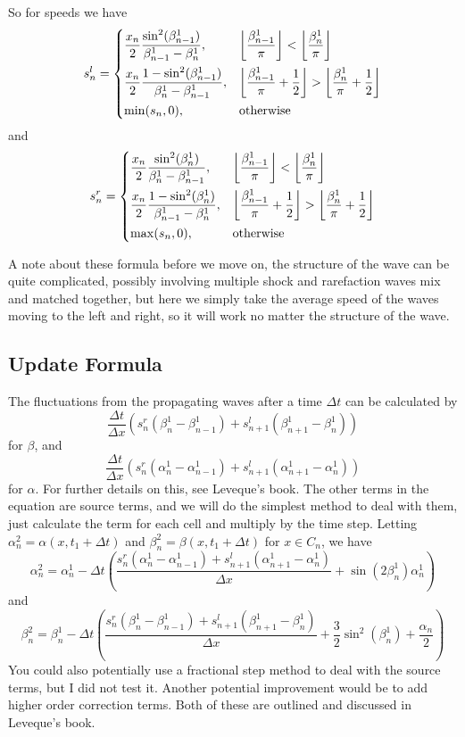 \documentclass[12pt]{article}
\begin{document}
So for speeds we have
\[ s^l_n = \begin{dcases}
    \frac{x_n}{2} \frac{\sin^2(\beta_{n-1}^1)}{\beta_{n-1}^1 - \beta_n^1}, & \left\lfloor
    \frac{\beta_{n-1}^1}{\pi} \right\rfloor < \left\lfloor \frac{\beta_n^1}{\pi} \right\rfloor \\
    \frac{x_n}{2} \frac{1 - \sin^2(\beta_{n-1}^1)}{\beta_n^1 - \beta_{n-1}^1}, & \left\lfloor
    \frac{\beta_{n-1}^1}{\pi} + \frac{1}{2} \right\rfloor > \left\lfloor \frac{\beta_n^1}{\pi} +
    \frac{1}{2} \right\rfloor \\
    \min(s_n, 0), & \text{otherwise}
\end{dcases} \]
and
\[ s^r_n = \begin{dcases}
    \frac{x_n}{2} \frac{\sin^2(\beta_n^1)}{\beta_n^1 - \beta_{n-1}^1}, & \left\lfloor
    \frac{\beta_{n-1}^1}{\pi} \right\rfloor < \left\lfloor \frac{\beta_n^1}{\pi} \right\rfloor \\
    \frac{x_n}{2} \frac{1 - \sin^2(\beta_n^1)}{\beta_{n-1}^1 - \beta_n^1}, & \left\lfloor
    \frac{\beta_{n-1}^1}{\pi} + \frac{1}{2} \right\rfloor > \left\lfloor \frac{\beta_n^1}{\pi} +
    \frac{1}{2} \right\rfloor \\
    \max(s_n, 0), & \text{otherwise}
\end{dcases} \]

A note about these formula before we move on, the structure of the wave can be quite complicated,
possibly involving multiple shock and rarefaction waves mix and matched together, but here we simply
take the average speed of the waves moving to the left and right, so it will work no matter the
structure of the wave.

\subsection{Update Formula}

The fluctuations from the propagating waves after a time $\Delta t$ can be calculated by
\[ \frac{\Delta t}{\Delta x} (s^r_n (\beta_n^1 - \beta_{n-1}^1) + s^l_{n+1} (\beta_{n+1}^1 -
\beta_n^1)) \]
for $\beta$, and
\[ \frac{\Delta t}{\Delta x} (s^r_n (\alpha_n^1 - \alpha_{n-1}^1) + s^l_{n+1} (\alpha_{n+1}^1 -
\alpha_n^1)) \]
for $\alpha$. For further details on this, see Leveque's book. The other terms in the equation are
source terms, and we will do the simplest method to deal with them, just calculate the term for each
cell and multiply by the time step. Letting $\alpha_n^2 = \alpha(x,t_1 + \Delta t)$ and $\beta_n^2 =
\beta(x,t_1 + \Delta t)$ for $x \in C_n$, we have
\[ \alpha_n^2 = \alpha_n^1 - \Delta t \left( \frac{s^r_n (\alpha_n^1 - \alpha_{n-1}^1) + s^l_{n+1}
(\alpha_{n+1}^1 - \alpha_n^1)}{\Delta x} + \sin(2\beta_n^1)\alpha_n^1 \right) \]
and
\[ \beta_n^2 = \beta_n^1 - \Delta t \left( \frac{s^r_n (\beta_n^1 - \beta_{n-1}^1) + s^l_{n+1}
(\beta_{n+1}^1 - \beta_n^1)}{\Delta x} + \frac{3}{2}\sin^2(\beta_n^1) + \frac{\alpha_n}{2} \right)
\]
You could also potentially use a fractional step method to deal with the source terms, but I did not
test it. Another potential improvement would be to add higher order correction terms. Both of these
are outlined and discussed in Leveque's book.
\end{document}
